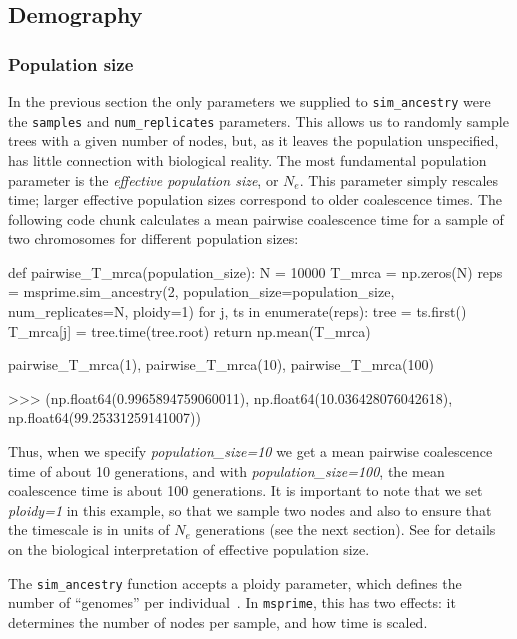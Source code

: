 \documentclass[graybox]{svmult}
\newcommand{\msprime}[0]{\texttt{msprime}}
\begin{document}
\subsection{Demography}\label{Demography}

\subsubsection{Population size}\label{population-models}

In the previous section the only parameters we supplied to
\texttt{sim\_ancestry} were the \texttt{samples} and
\texttt{num\_replicates} parameters. This allows us to randomly sample
trees with a given number of nodes, but, as it leaves the population
unspecified, has little connection with
biological reality. The most fundamental population parameter is the \emph{effective population size}, or
\(N_e\). This parameter simply rescales time; larger effective
population sizes correspond to older coalescence times. The following code chunk
calculates a mean pairwise coalescence time for a sample of two chromosomes
for different population sizes:

\begin{pythoncode}
def pairwise_T_mrca(population_size):
    N = 10000
    T_mrca = np.zeros(N)
    reps = msprime.sim_ancestry(2, population_size=population_size,
        num_replicates=N, ploidy=1)
    for j, ts in enumerate(reps):
        tree = ts.first()
        T_mrca[j] = tree.time(tree.root)
    return np.mean(T_mrca)

pairwise_T_mrca(1), pairwise_T_mrca(10), pairwise_T_mrca(100)

>>> (np.float64(0.9965894759060011),
     np.float64(10.036428076042618),
     np.float64(99.25331259141007))

\end{pythoncode}

Thus, when we specify \emph{population\_size=10} we get a mean pairwise coalescence time of about
10 generations, and with \emph{population\_size=100}, the mean coalescence time is about
100 generations. It is important to note that we set \emph{ploidy=1} in
this example, so that we sample two nodes and also to ensure that the timescale
is in units of $N_e$ generations (see the next section).
See \cite{wakely2008coalescent} for details on the
biological interpretation of effective population size.

\label{ploidy}
The \texttt{sim\_ancestry} function accepts a ploidy parameter, which defines
the number of ``genomes'' per individual~\cite{wong2024general}.
In \msprime, this has two effects: it determines the number of nodes
per sample, and how time is scaled.
\end{document}
